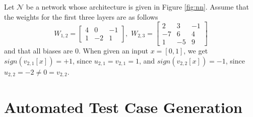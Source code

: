 \documentclass[runningheads,a4paper]{llncs}
\newcommand{\xiaowei}[1]{{\color{blue}#1}}
\newcommand{\youcheng}[1]{{\color{red}#1}}
\newcommand{\networks}{\mathcal{N}}
\begin{document}
\begin{example}\label{example:weights}
%
Let $\networks$ be a network whose architecture is given in Figure \ref{fig:nn}.  
Assume that the weights for the first three layers are as follows
%
\[
W_{1,2}=
\begin{bmatrix}
  4 & 0 & -1\\
  1 & -2 & 1
\end{bmatrix},\,\,
W_{2,3}=
\begin{bmatrix}
  2 & 3 & -1\\
  -7 & 6 & 4 \\
  1 & -5 & 9
\end{bmatrix}
\]
and that all biases are 0. When given an input 
$x=[0, 1]$, we get $\mathit{sign}(v_{2,1}[x])=+1$, since
$u_{2,1}=v_{2,1}=1$, and $\mathit{sign}(v_{2,2}[x])=-1$,
since $u_{2,2} = -2 \neq 0 = v_{2,2}$. 
%
\end{example}%

\section{Automated Test Case Generation}\label{sec:test-gen}\newcommand{\constraints}{\mathcal{C}}
\end{document}
